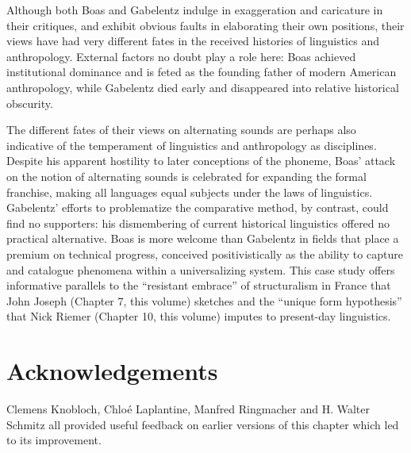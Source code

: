 \documentclass[output=paper]{langscibook}
\begin{document}
Although both Boas and Gabelentz indulge in exaggeration and caricature in their critiques, and exhibit obvious faults in elaborating their own positions, their views have had very different fates in the received histories of linguistics and anthropology. External factors no doubt play a role here: Boas achieved institutional dominance and is feted as the founding father of modern American anthropology, while Gabelentz died early and disappeared into relative historical obscurity. 

The different fates of their views on alternating sounds are perhaps also indicative of the temperament of linguistics and anthropology as disciplines. Despite his apparent hostility to later conceptions of the phoneme, Boas' attack on the notion of alternating sounds is celebrated for expanding the formal franchise, making all languages equal subjects under the laws of linguistics. Gabelentz' efforts to problematize the comparative method, by contrast, could find no supporters: his dismembering of current historical linguistics offered no practical alternative. Boas is more welcome than Gabelentz in fields that place a premium on technical progress, conceived positivistically as the ability to capture and catalogue phenomena within a universalizing system. This case study offers informative parallels to the ``resistant embrace'' of structuralism in France that John Joseph (Chapter 7, this volume) sketches and the ``unique form hypothesis'' that Nick Riemer (Chapter 10, this volume) imputes to present-day linguistics.

\section*{Acknowledgements}

Clemens Knobloch, Chloé Laplantine, Manfred Ringmacher and H. Walter Schmitz all provided useful feedback on earlier versions of this chapter which led to its improvement.

\printbibliography[heading=subbibliography,notkeyword=this]
\end{document}
